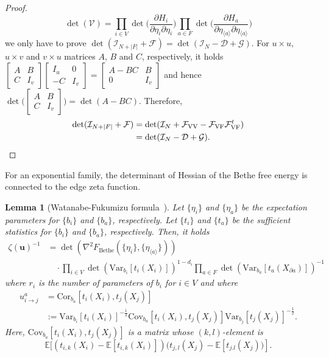 \documentclass[a4paper,10pt,twoside,twocolumn,openany,final]{memoir}
\newcommand{\Var}{\mathrm{Var}}
\newcommand{\Cov}{\mathrm{Cov}}
\newcommand{\Cor}{\mathrm{Cor}}
\theoremstyle{plain}
\newtheorem{lemma}[theorem]{Lemma}
\theoremstyle{definition}
\theoremstyle{remark}
\begin{document}
\begin{proof}
\begin{equation*}
\det(\mathcal{V})
=\prod_{i\in V} \det\Big(\frac{\partial H_i}{\partial \eta_i \partial \eta_i}\Big)
\prod_{a\in F} \det\Big(\frac{\partial H_a}{\partial \eta_{\langle a\rangle} \partial \eta_{\langle a\rangle}}\Big)
\end{equation*}
we only have to prove
$\det(\mathcal{I}_{N+|F|} + \mathcal{F})
= \det(\mathcal{I}_{N}-\mathcal{D}+\mathcal{G})$.
For $u\times u$, $u\times v$ and $v\times u$ matrices $A$, $B$ and $C$, respectively,
it holds
$
\begin{bmatrix}
A& B\\
C& I_v
\end{bmatrix}
\begin{bmatrix}
I_u& 0\\
-C& I_v
\end{bmatrix}
=
\begin{bmatrix}
A-BC& B\\
0& I_v
\end{bmatrix}
$
and hence
$
\det\bigg(
\begin{bmatrix}
A& B\\
C& I_v
\end{bmatrix}
\bigg)
=\det(A-BC)$.
Therefore,
\begin{align*}
\det(\mathcal{I}_{N+|F|}+\mathcal{F}) &= \det(\mathcal{I}_{N}+\mathcal{F}_\mathrm{VV}-\mathcal{F}_\mathrm{VF}\mathcal{F}_\mathrm{VF}^t)\\
&= \det(\mathcal{I}_{N}-\mathcal{D}+\mathcal{G}).\qedhere
\end{align*}
\end{proof}

For an exponential family, the determinant of Hessian of the Bethe free energy is connected to
the edge zeta function.
\begin{lemma}[Watanabe-Fukumizu formula~\cite{watanabe2010thesis}]
Let $\{\eta_i\}$ and $\{\eta_a\}$ be the expectation parameters for $\{b_i\}$ and $\{b_a\}$, respectively.
Let $\{t_i\}$ and $\{t_a\}$ be the sufficient statistics for $\{b_i\}$ and $\{b_a\}$, respectively.
Then, it holds
\begin{align*}
\zeta(\bm{u})^{-1}&=
\det(\nabla^2 F_\mathrm{Bethe}(\{\eta_i\}, \{\eta_{\langle a\rangle}\}))\\
&\quad\cdot \prod_{i\in V} \det(\Var_{b_i}[t_i(X_i)])^{1-d_i}
\prod_{a\in F} \det(\Var_{b_a}[t_a(X_{\partial a})])^{-1}
\end{align*}
where 
$r_i$ is the number of parameters of $b_i$ for $i\in V$ and where
\begin{align*}
u_{i\to j}^a &= 
\Cor_{b_a}[t_i(X_i), t_j(X_j)]\\
&:=
\Var_{b_i}[t_i(X_i)]^{-\frac12}
\Cov_{b_a}[t_i(X_i), t_j(X_j)]
\Var_{b_j}[t_j(X_j)]^{-\frac12}.
\end{align*}
Here, $\Cov_{b_a}[t_i(X_i), t_j(X_j)]$ is a matrix whose $(k, l)$-element is
\begin{equation*}
\mathbb{E}[(t_{i,k}(X_i) - \mathbb{E}[t_{i,k}(X_i)])(t_{j,l}(X_j)-\mathbb{E}[t_{j.l}(X_j))].
\end{equation*}
\end{lemma}
\end{document}
